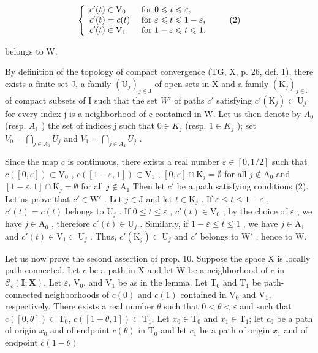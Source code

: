 \[
\left\{ \begin{array}{l l} c ^ {\prime} (t) \in \mathrm{V} _ {0} & \text { for } 0 \leqslant t \leqslant \varepsilon , \\ c ^ {\prime} (t) = c (t) & \text { for } \varepsilon \leqslant t \leqslant 1 - \varepsilon , \\ c ^ {\prime} (t) \in \mathrm{V} _ {1} & \text { for } 1 - \varepsilon \leqslant t \leqslant 1, \end{array} \right.\tag{2}
\]

belongs to W.

By definition of the topology of compact convergence (TG, X, p. 26, def. 1), there exists a finite set J, a family \((\mathrm{U}_{j})_{j\in\mathrm{J}}\) of open sets in X and a family \((\mathrm{K}_{j})_{j\in\mathrm{J}}\) of compact subsets of I such that the set \(W'\) of paths \(c'\) satisfying \(c'(\mathrm{K}_{j})\subset\mathrm{U}_{j}\) for every index j is a neighborhood of c contained in W. Let us then denote by \(A_{0}\) (resp. \(A_{1}\) ) the set of indices j such that \(0\in K_{j}\) (resp. \(1\in K_{j}\) ); set \(V_{0}=\bigcap_{j\in A_{0}}U_{j}\) and \(V_{1}=\bigcap_{j\in A_{1}}U_{j}\) .

Since the map \(c\) is continuous, there exists a real number \(\varepsilon \in [0,1/2]\) such that \(c([0,\varepsilon]) \subset \mathrm{V}_0\) , \(c([1-\varepsilon,1]) \subset \mathrm{V}_1\) , \([0,\varepsilon] \cap \mathrm{K}_j = \emptyset\) for all \(j \notin \mathrm{A}_0\) and \([1-\varepsilon,1] \cap \mathrm{K}_j = \emptyset\) for all \(j \notin \mathrm{A}_1\) Then let \(c'\) be a path satisfying conditions (2). Let us prove that \(c' \in \mathrm{W}'\) . Let \(j \in \mathrm{J}\) and let \(t \in \mathrm{K}_j\) . If \(\varepsilon \leqslant t \leqslant 1-\varepsilon\) , \(c'(t) = c(t)\) belongs to \(\mathrm{U}_j\) . If \(0 \leqslant t \leqslant \varepsilon\) , \(c'(t) \in \mathrm{V}_0\) ; by the choice of \(\varepsilon\) , we have \(j \in \mathrm{A}_0\) , therefore \(c'(t) \in \mathrm{U}_j\) . Similarly, if \(1-\varepsilon \leqslant t \leqslant 1\) , we have \(j \in \mathrm{A}_1\) and \(c'(t) \in \mathrm{V}_1 \subset \mathrm{U}_j\) . Thus, \(c'(\mathrm{K}_j) \subset \mathrm{U}_j\) and \(c'\) belongs to \(\mathrm{W}'\) , hence to W.

Let us now prove the second assertion of prop. 10. Suppose the space X is locally path-connected. Let \(c\) be a path in X and let W be a neighborhood of \(c\) in \(\mathcal{C}_c(\mathbf{I};\mathbf{X})\). Let \(\varepsilon\), \(\mathrm{V}_0\), and \(\mathrm{V}_1\) be as in the lemma. Let \(\mathrm{T}_0\) and \(\mathrm{T}_1\) be path-connected neighborhoods of \(c(0)\) and \(c(1)\) contained in \(\mathrm{V}_0\) and \(\mathrm{V}_1\), respectively. There exists a real number \(\theta\) such that \(0 < \theta < \varepsilon\) and such that \(c([0,\theta]) \subset \mathrm{T}_0\), \(c([1 - \theta,1]) \subset \mathrm{T}_1\). Let \(x_0 \in \mathrm{T}_0\) and \(x_1 \in \mathrm{T}_1\); let \(c_0\) be a path of origin \(x_0\) and of endpoint \(c(\theta)\) in \(\mathrm{T}_0\) and let \(c_1\) be a path of origin \(x_1\) and of endpoint \(c(1 - \theta)\)

